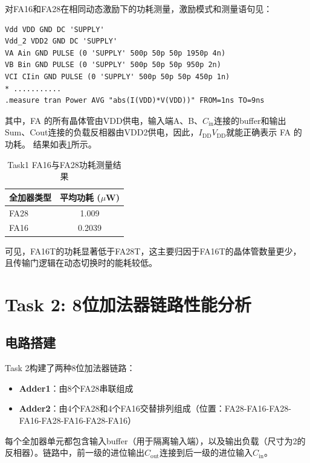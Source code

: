 \documentclass[UTF8,12pt,a4paper]{ctexart}
\begin{document}
对FA16和FA28在相同动态激励下的功耗测量，激励模式和测量语句见：
\begin{lstlisting}
Vdd VDD GND DC 'SUPPLY'
Vdd_2 VDD2 GND DC 'SUPPLY'
VA Ain GND PULSE (0 'SUPPLY' 500p 50p 50p 1950p 4n)
VB Bin GND PULSE (0 'SUPPLY' 500p 50p 50p 950p 2n)
VCI CIin GND PULSE (0 'SUPPLY' 500p 50p 50p 450p 1n)
* ...........
.measure tran Power AVG "abs(I(VDD)*V(VDD))" FROM=1ns TO=9ns
\end{lstlisting}
其中，FA 的所有晶体管由VDD供电，输入端A、B、$C_{\text{in}}$连接的buffer和输出Sum、Cout连接的负载反相器由VDD2供电，因此，$I_{\text{DD}}V_{\text{DD}}$就能正确表示 FA 的功耗。
结果如表\ref{tab:task1_power}所示。
\begin{table}[htbp]
    \centering
    \caption{Task1 FA16与FA28功耗测量结果}
    \label{tab:task1_power}
    \begin{tabular}{lc}
    \toprule
    全加器类型 & 平均功耗 ($\mu$W) \\
    \midrule
    FA28 & 1.009 \\
    FA16 & 0.2039 \\
    \bottomrule
    \end{tabular}
\end{table}

可见，FA16T的功耗显著低于FA28T，这主要归因于FA16T的晶体管数量更少，且传输门逻辑在动态切换时的能耗较低。

\newpage
\section{Task 2: 8位加法器链路性能分析}

\subsection{电路搭建}

Task 2构建了两种8位加法器链路：
\begin{itemize}
    \item \textbf{Adder1}：由8个FA28串联组成
    \item \textbf{Adder2}：由4个FA28和4个FA16交替排列组成（位置：FA28-FA16-FA28-FA16-FA28-FA16-FA28-FA16）
\end{itemize}

每个全加器单元都包含输入buffer（用于隔离输入端），以及输出负载（尺寸为2的反相器）。链路中，前一级的进位输出$C_{\text{out}}$连接到后一级的进位输入$C_{\text{in}}$。
\end{document}
